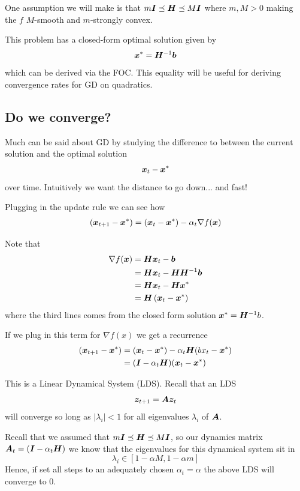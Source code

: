 \documentclass[11pt]{article}
\begin{document}
One assumption we will make is that $m\bm{I} \preceq \bm{H} \preceq M\bm{I}$ where $m, M > 0$ making the $f$ $M$-smooth and $m$-strongly convex. 

This problem has a closed-form optimal solution given by \[\bm{x}^* = \bm{H}^{-1}\bm{b}\] which can be derived via the FOC. This equality will be useful for deriving convergence rates for GD on quadratics.

\subsection{Do we converge?}

Much can be said about GD by studying the difference to between the current solution and the optimal solution \[\bm{x}_{t} - \bm{x}^*\] over time. Intuitively we want the distance to go down... and fast!

Plugging in the update rule we can see how 
\begin{align*} 
\left(\bm{x}_{t+1} - \bm{x}^*\right) = \left(\bm{x}_t - \bm{x}^*\right) - \alpha_t \nabla f(\bm{x})
\end{align*}

Note that
\begin{align*}
    \nabla f(\bm{x}) &= \bm{H}\bm{x}_t - \bm{b} \\
                  &= \bm{H}\bm{x}_t - \bm{H}\bm{H}^{-1}\bm{b} \\
                  &= \bm{H}\bm{x}_t - \bm{H}\bm{x}^* \\
                  &= \bm{H}\left(\bm{x}_t -\bm{x}^*\right)
\end{align*}
where the third lines comes from the closed form solution $\bm{x}^* = \bm{H}^{-1}b$.


If we plug in this term for $\nabla f(x)$ we get a recurrence
\begin{align*} 
\left(\bm{x}_{t+1} - \bm{x}^*\right) &= \left(\bm{x}_t - \bm{x}^*\right) - \alpha_t \bm{H}(bx_t - \bm{x}^*) \\
&= (\bm{I} - \alpha_t \bm{H})(\bm{x}_t - \bm{x}^*) \\
\end{align*}


This is a Linear Dynamical System (LDS). Recall that an LDS
\[\bm{z}_{t+1} =\bm{A}\bm{z}_t\] will converge so long as $|\lambda_i| < 1$ for all eigenvalues $\lambda_i$ of $\bm{A}$. 

Recall that we assumed that $m\bm{I} \preceq \bm{H} \preceq M\bm{I}$, so our dynamics matrix $\bm{A}_t = \left(\bm{I} - \alpha_t \bm{H}\right)$ we know that the eigenvalues for this dynamical system sit in \[\lambda_i \in [1-\alpha M, 1-\alpha m]\]
Hence, if set all steps to an adequately chosen $\alpha_t = \alpha$ the above LDS will converge to 0.
\end{document}

